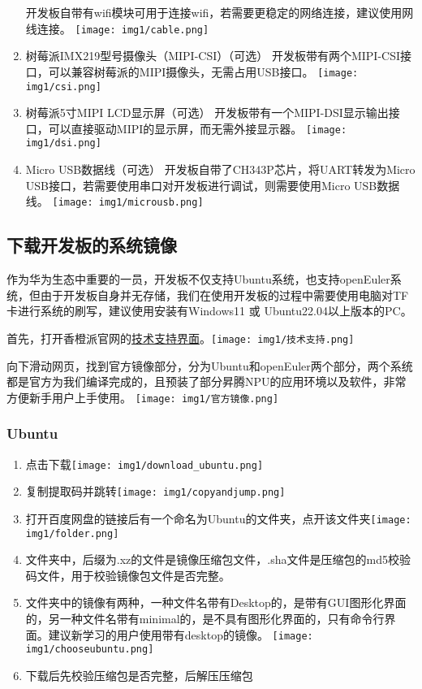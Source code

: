 \begin{enumerate}
  开发板自带有wifi模块可用于连接wifi，若需要更稳定的网络连接，建议使用网线连接。
  \texttt{[image: img1/cable.png]}
\item
  树莓派IMX219型号摄像头（MIPI-CSI）（可选）
  开发板带有两个MIPI-CSI接口，可以兼容树莓派的MIPI摄像头，无需占用USB接口。
  \texttt{[image: img1/csi.png]}
\item
  树莓派5寸MIPI LCD显示屏（可选）
  开发板带有一个MIPI-DSI显示输出接口，可以直接驱动MIPI的显示屏，而无需外接显示器。
  \texttt{[image: img1/dsi.png]}
\item
  Micro USB数据线（可选） 开发板自带了CH343P芯片，将UART转发为Micro
  USB接口，若需要使用串口对开发板进行调试，则需要使用Micro USB数据线。
  \texttt{[image: img1/microusb.png]}
\end{enumerate}

\hypertarget{ux4e0bux8f7dux5f00ux53d1ux677fux7684ux7cfbux7edfux955cux50cf}{%
\subsection{下载开发板的系统镜像}\label{ux4e0bux8f7dux5f00ux53d1ux677fux7684ux7cfbux7edfux955cux50cf}}

作为华为生态中重要的一员，开发板不仅支持Ubuntu系统，也支持openEuler系统，但由于开发板自身并无存储，我们在使用开发板的过程中需要使用电脑对TF卡进行系统的刷写，建议使用安装有Windows11
或 Ubuntu22.04以上版本的PC。

首先，打开香橙派官网的\href{http://www.orangepi.cn/html/hardWare/computerAndMicrocontrollers/service-and-support/Orange-Pi-AIpro.html}{技术支持界面}。\texttt{[image: img1/技术支持.png]}

向下滑动网页，找到官方镜像部分，分为Ubuntu和openEuler两个部分，两个系统都是官方为我们编译完成的，且预装了部分昇腾NPU的应用环境以及软件，非常方便新手用户上手使用。
\texttt{[image: img1/官方镜像.png]}

\hypertarget{ubuntu}{%
\subsubsection{Ubuntu}\label{ubuntu}}

\begin{enumerate}
\def\labelenumi{\arabic{enumi}.}
\tightlist
\item
  点击下载\texttt{[image: img1/download\_ubuntu.png]}
\item
  复制提取码并跳转\texttt{[image: img1/copyandjump.png]}
\item
  打开百度网盘的链接后有一个命名为Ubuntu的文件夹，点开该文件夹\texttt{[image: img1/folder.png]}
\item
  文件夹中，后缀为.xz的文件是镜像压缩包文件，.sha文件是压缩包的md5校验码文件，用于校验镜像包文件是否完整。
\item
  文件夹中的镜像有两种，一种文件名带有Desktop的，是带有GUI图形化界面的，另一种文件名带有minimal的，是不具有图形化界面的，只有命令行界面。建议新学习的用户使用带有desktop的镜像。
  \texttt{[image: img1/chooseubuntu.png]}
\item
  下载后先校验压缩包是否完整，后解压压缩包
\end{enumerate}

